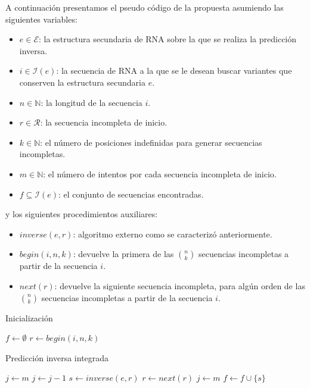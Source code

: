 A continuaci\'on presentamos el pseudo c\'odigo de la propuesta asumiendo las
siguientes variables:
\begin{itemize}
 \item $e \in \mathcal{E}$: la estructura secundaria de \ac{RNA} sobre la que se
realiza la predicci\'on inversa.
 \item $i \in \mathcal{I}(e)$: la secuencia de \ac{RNA} a la que se le desean
buscar variantes que conserven la estructura secundaria $e$.
 \item $n \in \mathbb{N}$: la longitud de la secuencia $i$.
 \item $r \in \mathcal{R}$: la secuencia incompleta de inicio.
 \item $k \in \mathbb{N}$: el n\'umero de posiciones indefinidas para generar
secuencias incompletas.
 \item $m \in \mathbb{N}$: el n\'umero de intentos por cada secuencia incompleta
de inicio.
 \item $f \subseteq \mathcal{I}(e)$: el conjunto de secuencias encontradas.
\end{itemize}

y los siguientes procedimientos auxiliares:
\begin{itemize}
 \item $inverse(e,r)$: algoritmo externo como se caracteriz\'o anteriormente.
 \item $begin(i,n,k)$: devuelve la primera de las $n \choose k$ secuencias
incompletas a partir de la secuencia $i$.
 \item $next(r)$: devuelve la siguiente secuencia incompleta, para alg\'un orden
de las $n \choose k$ secuencias incompletas a partir de la secuencia $i$.
\end{itemize}

\begin{algorithm}
 \caption{Inicializaci\'on}
\begin{algorithmic}[1]
\STATE $f \leftarrow \emptyset$ 
\STATE $r \leftarrow begin(i,n,k)$
\end{algorithmic}
\end{algorithm}

\begin{algorithm}
 \caption{Predicci\'on inversa integrada}
 \begin{algorithmic}[1]
 \STATE $j \leftarrow m$
 \REPEAT
 \STATE $j \leftarrow j-1$
 \STATE $s \leftarrow inverse(e,r)$
 \STATE $r \leftarrow next(r)$
 \STATE $j \leftarrow m$
 \ENDIF
 \STATE $f \leftarrow f \cup \{s\}$
 \end{algorithmic}
\end{algorithm}
